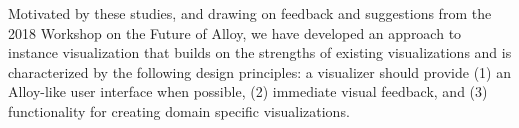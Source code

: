 \documentclass[runningheads]{llncs}
\begin{document}


Motivated by these studies, and drawing on feedback and suggestions from the 2018 Workshop on the Future of Alloy, we have developed an approach to instance visualization that builds on the strengths of existing visualizations and is characterized by the following design principles: a visualizer should provide (1) an Alloy-like user interface when possible, (2) immediate visual feedback, and (3) functionality for creating domain specific visualizations.

\end{document}
